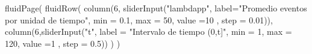 \documentclass[
  letterpaper,
  DIV=11,
  numbers=noendperiod]{scrreprt}
\newenvironment{Shaded}{\begin{snugshade}}{\end{snugshade}}
\newcommand{\AttributeTok}[1]{\textcolor[rgb]{0.40,0.45,0.13}{#1}}
\newcommand{\DecValTok}[1]{\textcolor[rgb]{0.68,0.00,0.00}{#1}}
\newcommand{\FloatTok}[1]{\textcolor[rgb]{0.68,0.00,0.00}{#1}}
\newcommand{\FunctionTok}[1]{\textcolor[rgb]{0.28,0.35,0.67}{#1}}
\newcommand{\NormalTok}[1]{\textcolor[rgb]{0.00,0.23,0.31}{#1}}
\newcommand{\StringTok}[1]{\textcolor[rgb]{0.13,0.47,0.30}{#1}}
\begin{document}
\begin{Shaded}
\begin{Highlighting}[]
\FunctionTok{fluidPage}\NormalTok{(}
  \FunctionTok{fluidRow}\NormalTok{(}
      \FunctionTok{column}\NormalTok{(}\DecValTok{6}\NormalTok{,}
           \FunctionTok{sliderInput}\NormalTok{(}\StringTok{"lambdapp"}\NormalTok{, }\AttributeTok{label=}\StringTok{"Promedio eventos por unidad de tiempo"}\NormalTok{, }
                       \AttributeTok{min =} \FloatTok{0.1}\NormalTok{, }\AttributeTok{max =} \DecValTok{50}\NormalTok{, }\AttributeTok{value =}\DecValTok{10}\NormalTok{ , }\AttributeTok{step =} \FloatTok{0.01}\NormalTok{)),}
    \FunctionTok{column}\NormalTok{(}\DecValTok{6}\NormalTok{,}\FunctionTok{sliderInput}\NormalTok{(}\StringTok{"t"}\NormalTok{, }\AttributeTok{label =} \StringTok{"Intervalo de tiempo (0,t]"}\NormalTok{, }
                         \AttributeTok{min =} \DecValTok{1}\NormalTok{, }\AttributeTok{max =} \DecValTok{120}\NormalTok{, }\AttributeTok{value =}\DecValTok{1}\NormalTok{ , }\AttributeTok{step =} \FloatTok{0.5}\NormalTok{))}
\NormalTok{   )}
\NormalTok{)}



\end{Highlighting}
\end{Shaded}
\end{document}
